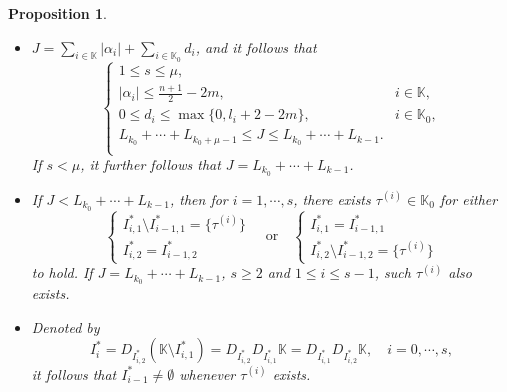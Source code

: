 \documentclass[11pt,reqno]{amsart}
\newtheorem{proposition}[theorem]{Proposition}
\numberwithin{equation}{section}
\theoremstyle{definition}
\begin{document}
\begin{proposition}
\begin{itemize}
		\item[(1)] $J=\sum_{i\in\mathbb{K}}|\alpha_i|+\sum_{i\in\mathbb{K}_0}d_i$, and it follows that
		\begin{equation}\label{stepmuconstraint1}
			\begin{cases}
				1\leq s\leq\mu,\\
				|\alpha_i|\leq\frac{n+1}{2}-2m,\quad&i\in\mathbb{K},\\
				0\leq d_i\leq\max\{0,l_i+2-2m\},\quad&i\in\mathbb{K}_0,\\
				L_{k_0}+\cdots+L_{k_0+\mu-1}\leq J\leq L_{k_0}+\cdots+L_{k-1}.\\
			\end{cases}
		\end{equation}
		If $s<\mu$, it further follows that $J=L_{k_0}+\cdots+L_{k-1}$.
		\item[(2)] If $J<L_{k_0}+\cdots+L_{k-1}$, then for $i=1,\cdots,s$, there exists $\tau^{(i)}\in\mathbb{K}_0$ for either
		\begin{equation}\label{stepmuconstraint2}
			\begin{cases}
				I_{i,1}^*\setminus I_{i-1,1}^*=\{\tau^{(i)}\}\\
				I_{i,2}^*=I_{i-1,2}^*	
			\end{cases}\quad\text{or}\quad\begin{cases}
				I_{i,1}^*=I_{i-1,1}^*\\
				I_{i,2}^*\setminus I_{i-1,2}^*=\{\tau^{(i)}\}
			\end{cases}
		\end{equation}
		to hold. If $J=L_{k_0}+\cdots+L_{k-1}$, $s\geq2$ and $1\leq i\leq s-1$, such $\tau^{(i)}$ also exists.
		
		\item[(3)] Denoted by
		\begin{equation}\label{defI_I^*}
			I_i^*=D_{I_{i,2}^*}(\mathbb{K}\setminus I_{i,1}^*)=D_{I_{i,2}^*}D_{I_{i,1}^*}\mathbb{K}=D_{I_{i,1}^*}D_{I_{i,2}^*}\mathbb{K},\quad i=0,\cdots,s,
		\end{equation}
		it follows that $I_{i-1}^*\neq\emptyset$ whenever $\tau^{(i)}$ exists.
		

\end{itemize}
\end{proposition}
\end{document}

